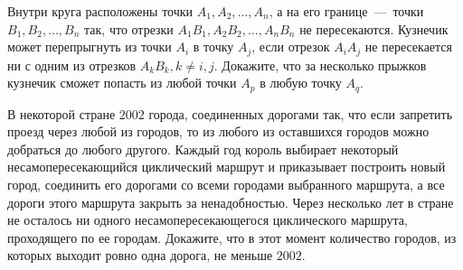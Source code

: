 \begin{exersize}
	Внутри круга расположены точки $A_1, A_2, \dots, A_n$, а на его границе~---~точки $B_1, B_2, \dots, B_n$ так, что отрезки 
	$A_1B_1, A_2B_2, \dots, A_nB_n$ не пересекаются. Кузнечик может перепрыгнуть из точки $A_i$ в точку $A_j$, если отрезок $A_iA_j$ 
	не пересекается ни с одним из отрезков $A_kB_k, k \neq i, j$. Докажите, что за несколько прыжков кузнечик сможет попасть 
	из любой точки $A_p$ в любую точку $A_q$.
\end{exersize}	

\begin{exersize}
	В некоторой стране $2002$ города, соединенных дорогами так, что если запретить проезд через любой из городов, 
	то из любого из оставшихся городов можно добраться до любого другого. Каждый год король выбирает некоторый несамопересекающийся 
	циклический маршрут и приказывает построить новый город, соединить его дорогами со всеми городами выбранного маршрута, а все дороги 
	этого маршрута закрыть за ненадобностью. Через несколько лет в стране не осталось ни одного несамопересекающегося циклического маршрута, 
	проходящего по ее городам. Докажите, что в этот момент количество городов, из которых выходит ровно одна дорога, не меньше $2002$.
\end{exersize}	 
